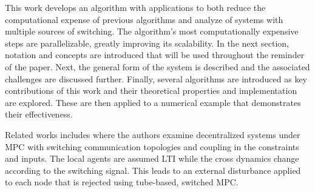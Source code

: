 This work develops an algorithm with applications to both reduce the computational expense of previous algorithms and analyze of systems with multiple sources of switching. The algorithm's most computationally expensive steps are parallelizable, greatly improving its scalability. In the next section, notation and concepts are introduced that will be used throughout the reminder of the paper. Next, the general form of the system is described and the associated challenges are discussed further. Finally, several algorithms are introduced as key contributions of this work and their theoretical properties and implementation are explored. These are then applied to a numerical example that demonstrates their effectiveness. 

Related works includes \cite{Ahandani2020} where the authors examine decentralized systems under MPC with switching communication topologies and coupling in the constraints and inputs. The local agents are assumed LTI while the cross dynamics change according to the switching signal. This leads to an external disturbance applied to each node that is rejected using tube-based, switched MPC.